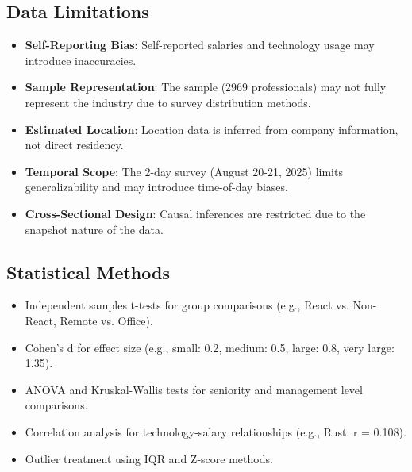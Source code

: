 \documentclass[12pt,a4paper]{article}
\begin{document}
	\subsection{Data Limitations}
	\begin{itemize}
		\item \textbf{Self-Reporting Bias}: Self-reported salaries and technology usage may introduce inaccuracies.
		\item \textbf{Sample Representation}: The sample (2969 professionals) may not fully represent the industry due to survey distribution methods.
		\item \textbf{Estimated Location}: Location data is inferred from company information, not direct residency.
		\item \textbf{Temporal Scope}: The 2-day survey (August 20-21, 2025) limits generalizability and may introduce time-of-day biases.
		\item \textbf{Cross-Sectional Design}: Causal inferences are restricted due to the snapshot nature of the data.
	\end{itemize}
	
	\subsection{Statistical Methods}
	\begin{itemize}
		\item Independent samples t-tests for group comparisons (e.g., React vs. Non-React, Remote vs. Office).
		\item Cohen's d for effect size (e.g., small: 0.2, medium: 0.5, large: 0.8, very large: 1.35).
		\item ANOVA and Kruskal-Wallis tests for seniority and management level comparisons.
		\item Correlation analysis for technology-salary relationships (e.g., Rust: r = 0.108).
		\item Outlier treatment using IQR and Z-score methods.
	\end{itemize}
	
\end{document}
